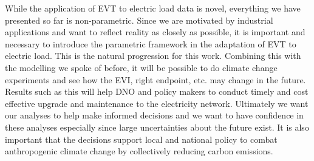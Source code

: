 While the application of EVT to electric load data is novel, everything we have presented so far is non-parametric. Since we are motivated by industrial applications and want to reflect reality as closely as possible, it is important and necessary to introduce the parametric framework in the adaptation of EVT to electric load. This is the natural progression for this work. Combining this with the modelling we spoke of before, it will be possible to do climate change experiments and see how the EVI, right endpoint, etc. may change in the future. Results such as this will help DNO and policy makers to conduct timely and cost effective upgrade and maintenance to the electricity network. Ultimately we want our analyses to help make informed decisions and we want to have confidence in these analyses especially since large uncertainties about the future exist. It is also important that the decisions support local and national policy to combat anthropogenic climate change by collectively reducing carbon emissions. 